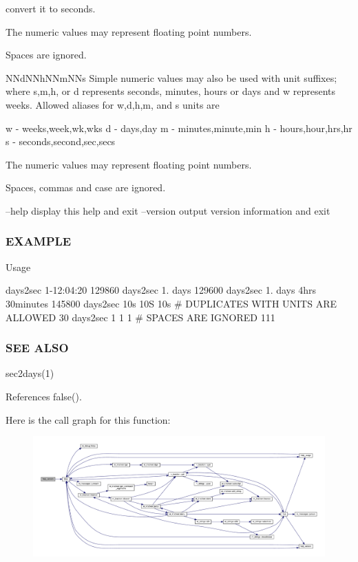 convert it to seconds.

The numeric values may represent floating point numbers.

Spaces are ignored.

N\+Nd\+N\+Nh\+N\+Nm\+N\+Ns Simple numeric values may also be used with unit suffixes; where s,m,h, or d represents seconds, minutes, hours or days and w represents weeks. Allowed aliases for w,d,h,m, and s units are

w -\/ weeks,week,wk,wks d -\/ days,day m -\/ minutes,minute,min h -\/ hours,hour,hrs,hr s -\/ seconds,second,sec,secs

The numeric values may represent floating point numbers.

Spaces, commas and case are ignored.

--help display this help and exit --version output version information and exit

\subsubsection*{E\+X\+A\+M\+P\+LE}

Usage

days2sec 1-\/12\+:04\+:20 129860 days2sec 1. days 129600 days2sec 1. days 4hrs 30minutes 145800 days2sec 10s 10S 10s \# D\+U\+P\+L\+I\+C\+A\+T\+ES W\+I\+TH U\+N\+I\+TS A\+RE A\+L\+L\+O\+W\+ED 30 days2sec 1 1 1 \# S\+P\+A\+C\+ES A\+RE I\+G\+N\+O\+R\+ED 111 \subsubsection*{S\+EE A\+L\+SO}

sec2days(1) 

References false().

Here is the call graph for this function\+:
\nopagebreak
\begin{figure}[H]
\begin{center}
\leavevmode
\includegraphics[width=350pt]{days2sec_8f90_a39c21619b08a3c22f19e2306efd7f766_cgraph}
\end{center}
\end{figure}
